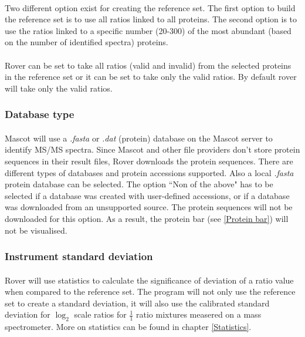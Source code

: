 \documentclass[11pt,a4paper,oneside,notitlepage]{book}
\begin{document}
\paragraph{}Two different option exist for creating the reference set. The first option to build the reference set is to use all ratios linked to all proteins. The second option is to use the ratios linked to a specific number (20-300) of the most abundant (based on the number of identified spectra) proteins.

\paragraph{}Rover can be set to take all ratios (valid and invalid) from the selected proteins in the reference set or it can be set to take only the valid ratios. By default rover will take only the valid ratios.

\subsubsection{Database type}\label{Database type}

\paragraph{}Mascot will use a \textit{.fasta} or \textit{.dat} (protein) database on the Mascot server to identify MS/MS spectra. Since Mascot and other file providers don't store protein sequences in their result files, Rover downloads the protein sequences. There are different types of databases and protein accessions supported. Also a local \textit{.fasta} protein database can be selected. The option ``Non of the above" has to be selected if a database was created with user-defined accessions, or if a database was downloaded from an unsupported  source. The protein sequences will not be downloaded for this option. As a result, the protein bar (see \ref{Protein bar}) will not be visualised.

\subsubsection{Instrument standard deviation}\label{Instrument standard deviation}

\paragraph{}Rover will use statistics to calculate the significance of deviation of a ratio value when compared to the reference set. The program will not only use the reference set to create a standard deviation, it will also use the calibrated standard deviation for $\log_{2}$ scale ratios for $\frac{1}{1}$ ratio mixtures measered on a mass spectrometer. More on statistics can be found in chapter \ref{Statistics}.
\end{document}
